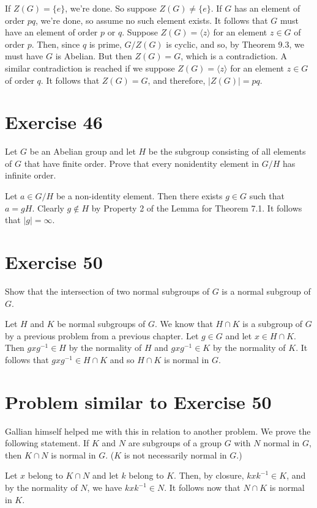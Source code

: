 \documentclass[12pt]{article}
\begin{document}
If $Z(G)=\{e\}$, we're done.  So suppose $Z(G)\neq\{e\}$.
If $G$ has an element of order $pq$, we're done,
so assume no such element exists.  It follows that
$G$ must have an element of order $p$ or $q$.  Suppose
$Z(G)=\langle z\rangle$ for an element $z\in G$ of
order $p$.  Then, since $q$ is prime, $G/Z(G)$ is cyclic,
and so, by Theorem 9.3, we must have $G$ is Abelian.
But then $Z(G)=G$, which is a contradiction.
A similar contradiction is reached if we suppose $Z(G)=\langle z\rangle$
for an element $z\in G$ of order $q$.  It follows that $Z(G)=G$,
and therefore, $|Z(G)|=pq$.

\section*{Exercise 46}

Let $G$ be an Abelian group and let $H$ be the subgroup consisting
of all elements of $G$ that have finite order.  Prove that every nonidentity
element in $G/H$ has infinite order.

Let $a\in G/H$ be a non-identity element.  Then there exists $g\in G$ such
that $a=gH$.  Clearly $g\not\in H$ by Property 2 of the Lemma for Theorem 7.1.
It follows that $|g|=\infty$.

\section*{Exercise 50}

Show that the intersection of two normal subgroups of $G$ is a normal subgroup of $G$.

Let $H$ and $K$ be normal subgroups of $G$.  We know that $H\cap K$ is a subgroup
of $G$ by a previous problem from a previous chapter.  Let $g\in G$ and let
$x\in H\cap K$.  Then $gxg^{-1}\in H$ by the normality of $H$ and $gxg^{-1}\in K$
by the normality of $K$.  It follows that $gxg^{-1}\in H\cap K$ and so $H\cap K$
is normal in $G$.

\section*{Problem similar to Exercise 50}

Gallian himself helped me with this in relation to another problem.
We prove the following statement.  If $K$ and $N$ are subgroups of a group
$G$ with $N$ normal in $G$, then $K\cap N$ is normal in $G$.  ($K$ is not necessarily
normal in $G$.)

Let $x$ belong to $K\cap N$ and let $k$ belong to $K$.  Then, by closure, $kxk^{-1}\in K$,
and by the normality of $N$, we have $kxk^{-1}\in N$.  It follows now that $N\cap K$
is normal in $K$.
\end{document}
